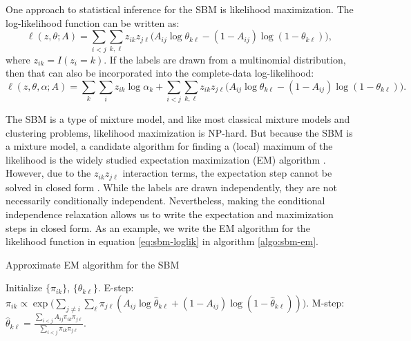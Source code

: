 \documentclass[
  11pt,
]{article}
\theoremstyle{definition}
\theoremstyle{definition}
\theoremstyle{definition}
\theoremstyle{definition}
\theoremstyle{remark}
\begin{document}
One approach to statistical inference for the SBM is likelihood maximization.
The log-likelihood function can be written as:
\begin{equation}
\label{eq:sbm-loglik}
\ell(z, \theta; A) = \sum_{i < j} \sum_{k, \ell} z_{ik} z_{j \ell} \big( 
A_{ij} \log \theta_{k \ell} - (1 - A_{ij}) \log (1 - \theta_{k \ell}) \big),
\end{equation}
where \(z_{ik} = I(z_i = k)\). If the labels are drawn from a multinomial distribution, then that can also be incorporated into the complete-data log-likelihood:
\begin{equation}
\label{eq:sbm-loglik-full}
\ell(z, \theta, \alpha; A) = \sum_k \sum_i z_{ik} \log \alpha_k + 
\sum_{i < j} \sum_{k, \ell} z_{ik} z_{j \ell} \big( 
A_{ij} \log \theta_{k \ell} - (1 - A_{ij}) \log (1 - \theta_{k \ell}) \big).
\end{equation}

The SBM is a type of mixture model, and like most classical mixture models and clustering problems, likelihood maximization is NP-hard.
But because the SBM is a mixture model, a candidate algorithm for finding a (local) maximum of the likelihood is the widely studied expectation maximization (EM) algorithm \citep{10.2307/2984875}.
However, due to the \(z_{ik} z_{j \ell}\) interaction terms, the expectation step cannot be solved in closed form \citep{kolaczyk2014statistical}.
While the labels are drawn independently, they are not necessarily conditionally independent.
Nevertheless, making the conditional independence relaxation allows us to write the expectation and maximization steps in closed form.
As an example, we write the EM algorithm for the likelihood function in equation \eqref{eq:sbm-loglik} in algorithm \ref{algo:sbm-em}.

\begin{algorithm}
\label{algo:sbm-em}
  \DontPrintSemicolon
  \SetAlgoLined
  \caption{Approximate EM algorithm for the SBM}
  Initialize $\{\pi_{ik}\}$, $\{\theta_{k \ell}\}$.\;
  \While{$\|\nabla \ell\| > \epsilon$} {
     {
       {
        E-step: $\pi_{ik} \propto \exp \bigg( \sum_{j \neq i} \sum_{\ell} \pi_{j \ell} (A_{ij} \log \hat{\theta}_{k \ell} + (1 - A_{ij}) \log (1 - \hat{\theta}_{k \ell})) \bigg)$.\;
        M-step: $\hat{\theta}_{k \ell} = \frac{\sum_{i < j} A_{ij} \pi_{ik} \pi_{j \ell}}{\sum_{i < j} \pi_{ik} \pi_{j \ell}}$.\;
      }
    }
  }
\end{algorithm}
\end{document}
